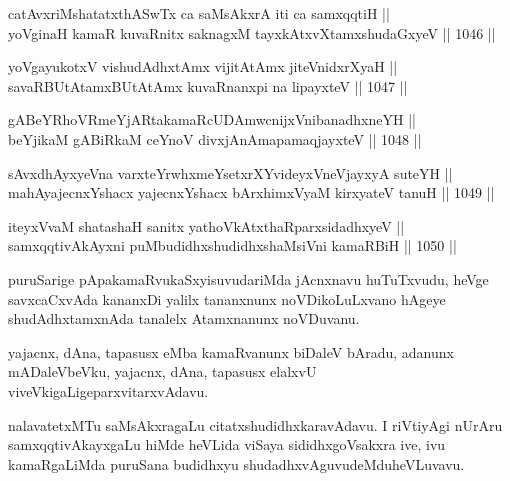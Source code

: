 \begin{shl}
catAvxriMshatatxthA\s SwTx ca saMsAkxrA iti ca samxqqtiH || \\
yoVginaH kamaR kuvaRnitx saknagxM tayxkAtxvX\s \s tamxshudaGxyeV \hfill || 1046 ||  
\end{shl}
				
\begin{shl}
yoVgayukotxV vishudAdhxtAmx vijitAtAmx jiteVnidxrXyaH || \\
savaRBUtAtamxBUtAtAmx kuvaRnanxpi na lipayxteV \hfill || 1047 ||  
\end{shl}
				
\begin{shl}
gABeYRhoVRmeYjARtakamaRcUDAmwcnijxVnibanadhxneYH || \\
beYjikaM gABiRkaM ceYnoV divxjAnAmapamaqjayxteV \hfill || 1048 ||  
\end{shl}
				
\begin{shl}
sAvxdhAyxyeVna varxteYrwhxmeYsetxrXYvideyxVneVjayxyA suteYH || \\
mahAyajecnxYshacx yajecnxYshacx bArxhimxVyaM kirxyateV tanuH \hfill || 1049 ||  
\end{shl}
				
\begin{shl}
iteyxVvaM shatashaH sanitx yathoVkAtxthaRparxsidadhxyeV ||  \\
samxqqtivAkAyxni puMbudidhxshudidhxshaMsiVni kamaRBiH \hfill || 1050 ||  
\end{shl}

\begin{artha}
puruSarige pApakamaRvukaSxyisuvudariMda jAcnxnavu huTuTxvudu, heVge savxcaCxvAda kananxDi yalilx tananxnunx noVDikoLuLxvano hAgeye shudAdhxtamxnAda  tanalelx Atamxnanunx noVDuvanu.
\end{artha}

\begin{artha}
yajacnx, dAna, tapasusx eMba kamaRvanunx biDaleV bAradu, adanunx mADaleVbeVku, yajacnx, dAna, tapasusx elalxvU viveVkigaLige\break parxvitarxvAdavu.
\end{artha}

\begin{artha}
nalavatetxMTu saMsAkxragaLu citatxshudidhxkaravAdavu. I riVtiyAgi nUrAru samxqqtivAkayxgaLu hiMde heVLida viSaya sididhxgoVsakxra ive, ivu kamaRgaLiMda puruSana budidhxyu shudadhxvAguvudeMdu\break heVLuvavu.
\end{artha}



